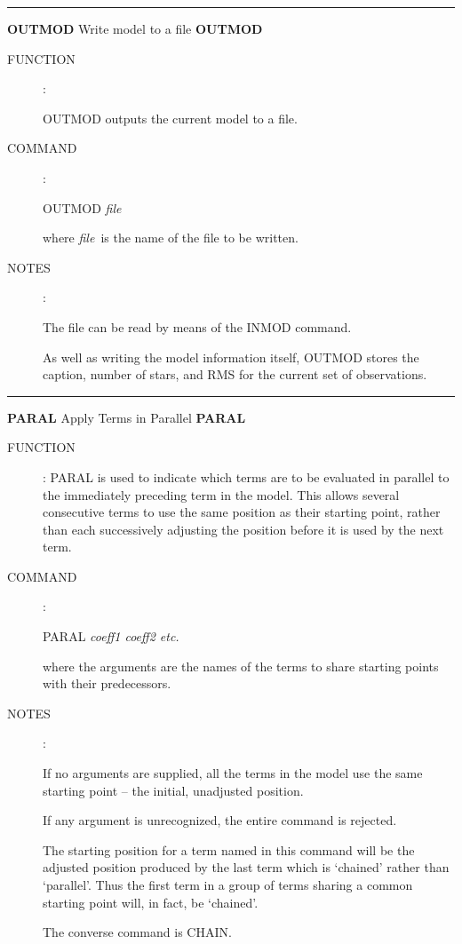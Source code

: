 
\goodbreak
\rule{\textwidth}{0.3mm}
{\Large {\bf OUTMOD} \hfill Write model to a file \hfill {\bf OUTMOD}}
\begin{description}
\item [FUNCTION]:

OUTMOD outputs the current model to a file.

\item [COMMAND]:

\begin{cmd}
\> \> OUTMOD {\it file}
\end{cmd}

where {\it file}\, is the name of the file to be written.

\item [NOTES]:

The file can be read by means of the INMOD command.

As well as writing the model information itself, OUTMOD
stores the caption, number of stars, and RMS for
the current set of observations.

\end{description}


\goodbreak
\rule{\textwidth}{0.3mm}
{\Large {\bf PARAL} \hfill Apply Terms in Parallel \hfill {\bf PARAL}}
\begin{description}
\item [FUNCTION]:
PARAL is used to indicate which terms are
to be evaluated in parallel to the immediately preceding term in the
model.  This allows several consecutive terms to use the
same position as their starting point, rather than each
successively adjusting the position before it is used by
the next term.

\item [COMMAND]:

\begin{cmd}
\> \> PARAL {\it coeff1 coeff2 etc.}
\end{cmd}

where the arguments are the names of the terms to
share starting points with their predecessors.

\item [NOTES]:

If no arguments are supplied, all the terms in the model
use the same starting point -- the initial, unadjusted
position.

If any argument is unrecognized, the entire command is
rejected.

The starting position for a term named in this command will
be the adjusted position produced by the last term which is
`chained' rather than `parallel'.  Thus the first term in
a group of terms sharing a common starting point will, in
fact, be `chained'.

The converse command is CHAIN.

\end{description}

